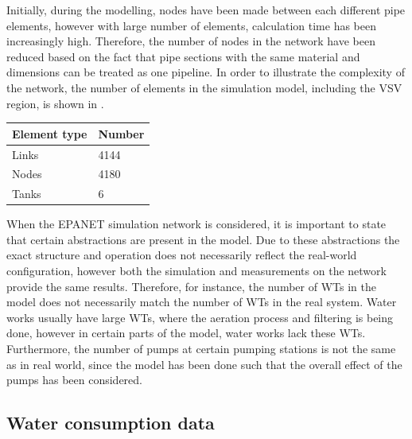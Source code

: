 Initially, during the modelling, nodes have been made between each different pipe elements, however with large number of elements, calculation time has been increasingly high. Therefore, the number of nodes in the network have been reduced based on the fact that pipe sections with the same material and dimensions can be treated as one pipeline. In order to illustrate the complexity of the network, the number of elements in the simulation model, including the VSV region, is shown in .

\begin{center}
\label{numberofelements_table}
    \begin{tabular}{ | p{3cm} | p{3cm} |}
    \hline
    \textbf{Element type} & \textbf{Number}  \\ 
    \hline
    Links & 4144  \\ 
    \hline
    Nodes & 4180  \\ 
    \hline
    Tanks & 6  \\ 
    \hline
    \end{tabular}
\end{center}

\vspace{-3mm}

When the EPANET simulation network is considered, it is important to state that certain abstractions are present in the model. Due to these abstractions the exact structure and operation does not necessarily reflect the real-world configuration, however both the simulation and measurements on the network provide the same results. Therefore, for instance, the number of WTs in the model does not necessarily match the number of WTs in the real system. Water works usually have large WTs, where the aeration process and filtering is being done, however in certain parts of the model, water works lack these WTs. Furthermore, the number of pumps at certain pumping stations is not the same as in real world, since the model has been done such that the overall effect of the pumps has been considered.  

\subsection{Water consumption data}
\label{water_consumption_data}

